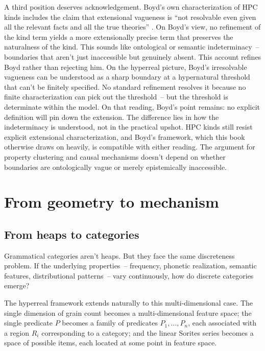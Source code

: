 A third position deserves acknowledgement. Boyd's own characterization of HPC kinds includes the claim that extensional vagueness is \enquote{not resolvable even given all the relevant facts and all the true theories} \citep[527]{boyd1979}. On Boyd's view, no refinement of the kind term yields a more extensionally precise term that preserves the naturalness of the kind. This sounds like ontological or semantic indeterminacy~-- boundaries that aren't just inaccessible but genuinely absent. This account refines Boyd rather than rejecting him. On the hyperreal picture, Boyd's irresolvable vagueness can be understood as a sharp boundary at a hypernatural threshold that can't be finitely specified. No standard refinement resolves it because no finite characterization can pick out the threshold~-- but the threshold is determinate within the model. On that reading, Boyd's point remains: no explicit definition will pin down the extension. The difference lies in how the indeterminacy is understood, not in the practical upshot. HPC kinds still resist explicit extensional characterization, and Boyd's framework, which this book otherwise draws on heavily, is compatible with either reading. The argument for property clustering and causal mechanisms doesn't depend on whether boundaries are ontologically vague or merely epistemically inaccessible.

\section{From geometry to mechanism}
\label{sec:5:geometry-to-mechanism}

\subsection{From heaps to categories}
\label{subsec:5:heaps-to-categories}

Grammatical categories aren't heaps. But they face the same discreteness problem. If the underlying properties~-- frequency, phonetic realization, semantic features, distributional patterns~-- vary continuously, how do discrete categories emerge?

The hyperreal framework extends naturally to this multi-dimensional case. The single dimension of grain count becomes a multi-dimensional feature space; the single predicate $P$ becomes a family of predicates $P_1, \ldots, P_n$, each associated with a region $R_i$ corresponding to a category; and the linear Sorites series becomes a space of possible items, each located at some point in feature space.

